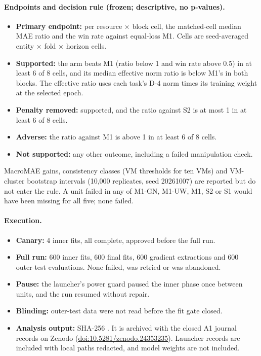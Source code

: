 \documentclass[a4paper,11pt]{article}
\begin{document}
\paragraph{Endpoints and decision rule (frozen; descriptive, no p-values).}
\begin{itemize}
\item \textbf{Primary endpoint:} per resource $\times$ block cell, the matched-cell median MAE ratio and the win
  rate against equal-loss M1. Cells are seed-averaged entity $\times$ fold $\times$ horizon cells.
\item \textbf{Supported:} the arm beats M1 (ratio below 1 and win rate above 0.5) in at least 6 of 8 cells, and its
  median effective norm ratio is below M1's in both blocks. The effective ratio uses each task's D-4 norm times its
  training weight at the selected epoch.
\item \textbf{Penalty removed:} supported, and the ratio against S2 is at most 1 in at least 6 of 8 cells.
\item \textbf{Adverse:} the ratio against M1 is above 1 in at least 6 of 8 cells.
\item \textbf{Not supported:} any other outcome, including a failed manipulation check.
\end{itemize}
MacroMAE gains, consistency classes (VM thresholds for ten VMs) and VM-cluster bootstrap intervals (10{,}000
replicates, seed 20261007) are reported but do not enter the rule. A unit failed in any of M1-GN, M1-UW, M1, S2
or S1 would have been missing for all five; none failed.

\paragraph{Execution.}
\begin{itemize}
\item \textbf{Canary:} 4 inner fits, all complete, approved before the full run.
\item \textbf{Full run:} 600 inner fits, 600 final fits, 600 gradient extractions and 600 outer-test evaluations.
  None failed, was retried or was abandoned.
\item \textbf{Pause:} the launcher's power guard paused the inner phase once between units, and the run resumed
  without repair.
\item \textbf{Blinding:} outer-test data were not read before the fit gate closed.
\item \textbf{Analysis output:} SHA-256
  \texttt{}. It is archived with the
  closed A1 journal records on Zenodo (\href{https://doi.org/10.5281/zenodo.24353235}{doi:10.5281/zenodo.24353235}).
  Launcher records are included with local paths redacted, and model weights are not included.
\end{itemize}
\end{document}
